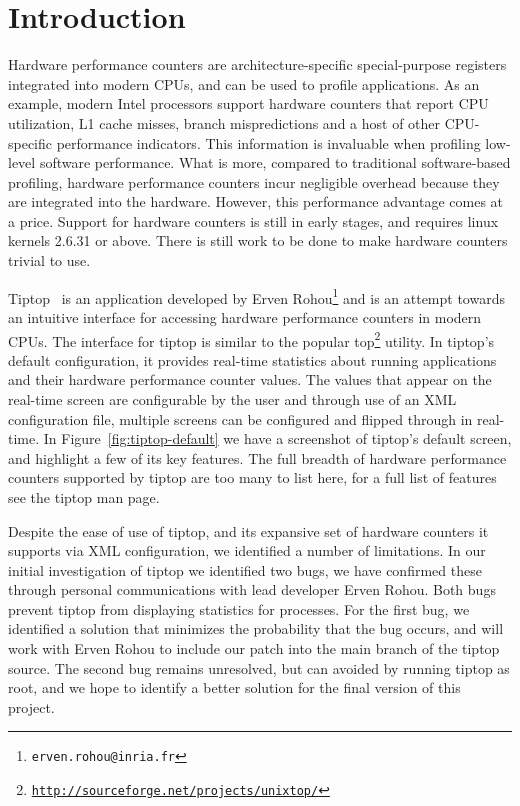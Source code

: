 \section{Introduction}
Hardware performance counters are architecture-specific special-purpose registers integrated into modern CPUs, and can be used to profile applications.
As an example, modern Intel processors support hardware counters that report CPU utilization, L1 cache misses, branch mispredictions and a host of other CPU-specific performance indicators.
This information is invaluable when profiling low-level software performance.
What is more, compared to traditional software-based profiling, hardware performance counters incur negligible overhead because they are integrated into the hardware.
However, this performance advantage comes at a price.
Support for hardware counters is still in early stages, and requires linux kernels 2.6.31 or above.
There is still work to be done to make hardware counters trivial to use.

Tiptop~\cite{rohou:hal-00639173} is an application developed by Erven Rohou\footnote{\texttt{erven.rohou@inria.fr}} and is an attempt towards an intuitive interface for accessing hardware performance counters in modern CPUs.
The interface for tiptop is similar to the popular top\footnote{\texttt{\url{http://sourceforge.net/projects/unixtop/}}} utility. 
In tiptop's default configuration, it provides real-time statistics about running applications and their hardware performance counter values.
The values that appear on the real-time screen are configurable by the user and through use of an XML configuration file, multiple screens can be configured and flipped through in real-time.
In Figure~\ref{fig:tiptop-default} we have a screenshot of tiptop's default screen, and highlight a few of its key features.
The full breadth of hardware performance counters supported by tiptop are too many to list here, for a full list of features see the tiptop man page.

Despite the ease of use of tiptop, and its expansive set of hardware counters it supports via XML configuration, we identified a number of limitations.
In our initial investigation of tiptop we identified two bugs, we have confirmed these through personal communications with lead developer Erven Rohou.
Both bugs prevent tiptop from displaying statistics for processes.
For the first bug, we identified a solution that minimizes the probability that the bug occurs, and will work with Erven Rohou to include our patch into the main branch of the tiptop source.
The second bug remains unresolved, but can avoided by running tiptop as root, and we hope to identify a better solution for the final version of this project.

